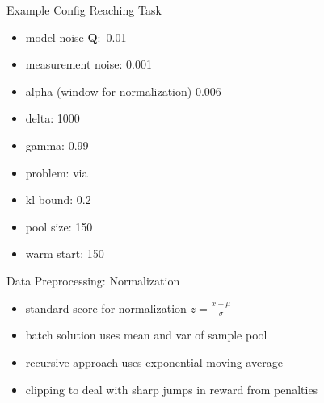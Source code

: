 \documentclass[navbarinfooter, 12pt]{sdqbeamer}
\begin{document}
\begin{frame}{Example Config Reaching Task}
  \begin{itemize}
  \item model noise $\textbf{Q}:$ 0.01
  \item measurement noise: 0.001
  \item alpha (window for normalization)  0.006
  \item delta: 1000
  \item gamma: 0.99
  \item problem: via
  \item kl bound: 0.2
  \item pool size: 150
  \item warm start: 150
  \end{itemize}
\end{frame}


\begin{frame}{Data Preprocessing: Normalization}
  \begin{itemize}
  \item standard score for normalization   $z = \frac{x - \mu}{\sigma}$
  \item batch solution uses mean and var of sample pool
  \item recursive approach uses exponential moving average
  \item clipping to deal with sharp jumps in reward from penalties
  \end{itemize}
\end{frame}



\end{document}

